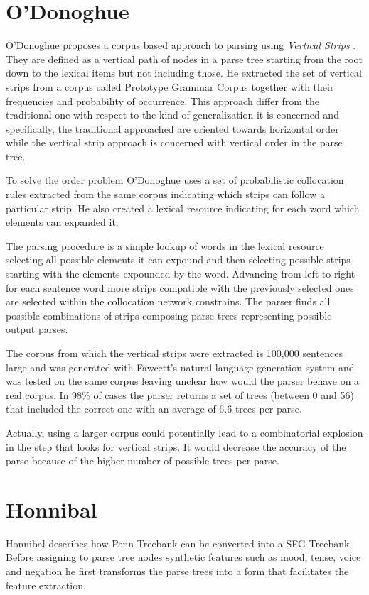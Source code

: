 \section{O'Donoghue}
O'Donoghue proposes a corpus based approach to parsing using \textit{Vertical Strips} \citep{ODonoghue1991a}. They are defined as a vertical path of nodes in a parse tree starting from the root down to the lexical items but not including those. He extracted the set of vertical strips from a corpus called Prototype Grammar Corpus together with their frequencies and probability of occurrence.
This approach differ from the traditional one with respect to the kind of generalization it is concerned and specifically, the traditional approached are oriented towards horizontal order while the vertical strip approach is concerned with vertical order in the parse tree. 

To solve the order problem O'Donoghue uses a set of probabilistic collocation rules extracted from the same corpus indicating which strips can follow a particular strip. He also created a lexical resource indicating for each word which elements can expanded it.

The parsing procedure is a simple lookup of words in the lexical resource selecting all possible elements it can expound and then selecting possible strips starting with the elements expounded by the word. Advancing from left to right for each sentence word more strips compatible with the previously selected ones are selected within the collocation network constrains. The parser finds all possible combinations of strips composing parse trees representing possible output parses. 

The corpus from which the vertical strips were extracted is 100,000 sentences large and was generated with Fawcett's natural language generation system and was tested on the same corpus leaving unclear how would the parser behave on a real corpus. In 98\% of cases the parser returns a set of trees (between 0 and 56) that included the correct one with an average of 6.6 trees per parse. 

Actually, using a larger corpus could potentially lead to a combinatorial explosion in the step that looks for vertical strips. It would decrease the accuracy of the parse because of the higher number of possible trees per parse.

\section{Honnibal}
Honnibal \citeyearpar{Honnibal2004a,Honnibal2007} describes how Penn Treebank can be converted into a SFG Treebank. Before assigning to parse tree nodes synthetic features such as mood, tense, voice and negation he first transforms the parse trees into a form that facilitates the feature extraction. 

